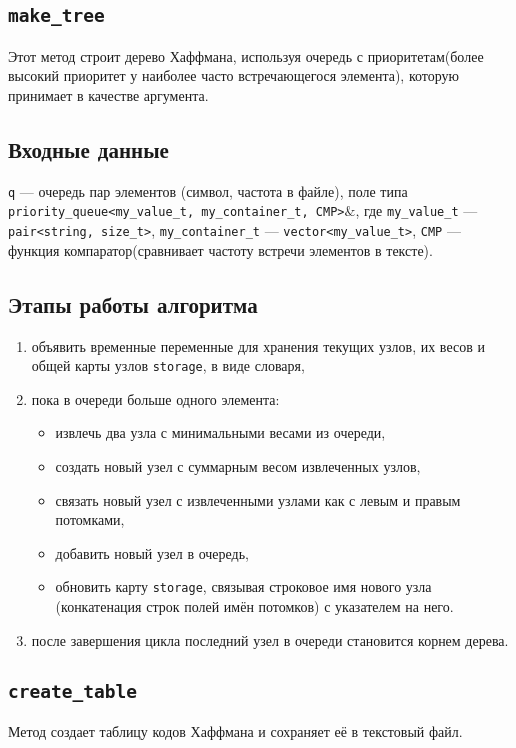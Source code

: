 \subsection{\texttt{make\_tree}}
Этот метод строит дерево Хаффмана, используя очередь с приоритетам(более высокий приоритет у наиболее часто встречающегося элемента), которую принимает в качестве аргумента.

\subsection*{Входные данные}
\texttt{q} --- очередь пар элементов (символ, частота в файле), поле типа \\ \texttt{priority\_queue<my\_value\_t, my\_container\_t, CMP>$\&$}, где \texttt{my\_value\_t} --- \texttt{pair<string, size\_t>}, \texttt{my\_container\_t} --- \texttt{vector<my\_value\_t>}, \texttt{CMP} --- функция компаратор(сравнивает частоту встречи элементов в тексте).

\subsection*{Этапы работы алгоритма}
\begin{enumerate}
	\item объявить временные переменные для хранения текущих узлов, их весов и общей карты узлов \texttt{storage}, в виде словаря,
	\item пока в очереди больше одного элемента:
	\begin{itemize}
		\item извлечь два узла с минимальными весами из очереди,
		\item создать новый узел с суммарным весом извлеченных узлов,
		\item связать новый узел с извлеченными узлами как с левым и правым потомками,
		\item добавить новый узел в очередь,
		\item обновить карту \texttt{storage}, связывая строковое имя нового узла (конкатенация строк полей имён потомков) с указателем на него.
	\end{itemize}
	\item после завершения цикла последний узел в очереди становится корнем дерева.
\end{enumerate}

\subsection{\texttt{create\_table}}
Метод создает таблицу кодов Хаффмана и сохраняет её в текстовый файл.

